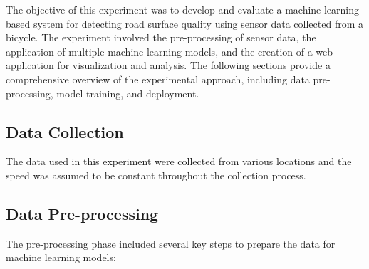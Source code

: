 \documentclass[a4paper,12pt]{Classes/RoboticsLaTeX}
\begin{document}
\begin{abstracts}
The objective of this experiment was to develop and evaluate a machine learning-based system for detecting road surface quality using sensor data collected from a bicycle. The experiment involved the pre-processing of sensor data, the application of multiple machine learning models, and the creation of a web application for visualization and analysis. The following sections provide a comprehensive overview of the experimental approach, including data pre-processing, model training, and deployment.

\subsection{Data Collection}

The data used in this experiment were collected from various locations and the speed was assumed to be constant throughout the collection process.
\subsection{Data Pre-processing}

The pre-processing phase included several key steps to prepare the data for machine learning models:


\end{abstracts}
\end{document}
